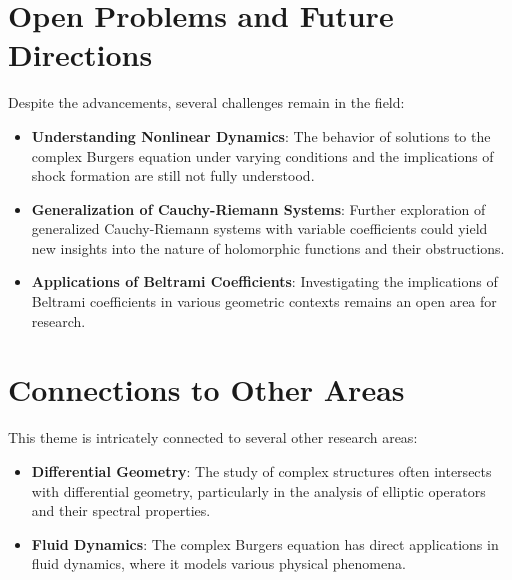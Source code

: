 \documentclass[11pt,a4paper]{article}
\begin{document}
\section{Open Problems and Future Directions}

Despite the advancements, several challenges remain in the field:

\begin{itemize}
\item \textbf{Understanding Nonlinear Dynamics}: The behavior of solutions to the complex Burgers equation under varying conditions and the implications of shock formation are still not fully understood.
\end{itemize}

\begin{itemize}
\item \textbf{Generalization of Cauchy-Riemann Systems}: Further exploration of generalized Cauchy-Riemann systems with variable coefficients could yield new insights into the nature of holomorphic functions and their obstructions.
\end{itemize}

\begin{itemize}
\item \textbf{Applications of Beltrami Coefficients}: Investigating the implications of Beltrami coefficients in various geometric contexts remains an open area for research.
\end{itemize}

\section{Connections to Other Areas}

This theme is intricately connected to several other research areas:

\begin{itemize}
\item \textbf{Differential Geometry}: The study of complex structures often intersects with differential geometry, particularly in the analysis of elliptic operators and their spectral properties.
\end{itemize}

\begin{itemize}
\item \textbf{Fluid Dynamics}: The complex Burgers equation has direct applications in fluid dynamics, where it models various physical phenomena.
\end{itemize}
\end{document}

